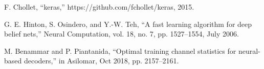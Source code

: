 \documentclass[conference]{IEEEtran}
\begin{document}
\begin{thebibliography}{00}
 F. Chollet, “keras,” https://github.com/fchollet/keras, 2015.

 G. E. Hinton, S. Osindero, and Y.-W. Teh, “A fast learning algorithm for deep belief nets,” Neural Computation, vol. 18, no. 7, pp. 1527–1554, July 2006.

 M. Benammar and P. Piantanida, “Optimal training channel statistics for neural-based decoders,” in Asilomar, Oct 2018, pp. 2157–2161.



\end{thebibliography}
\end{document}
